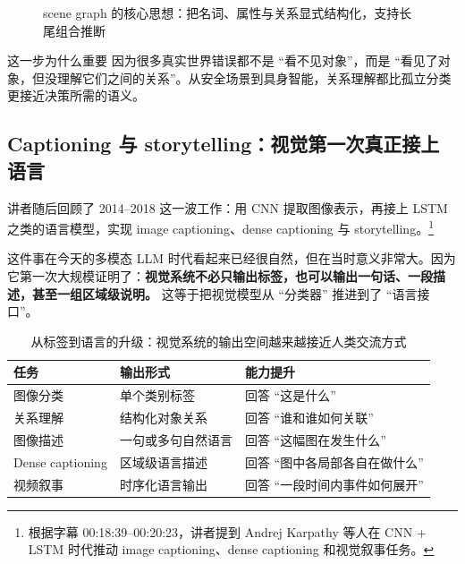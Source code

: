 \documentclass[a4paper]{article}
\begin{document}
\begin{figure}[H]
\centering
{}
\caption{scene graph 的核心思想：把名词、属性与关系显式结构化，支持长尾组合推断}
\end{figure}

\begin{importantbox}{这一步为什么重要}
因为很多真实世界错误都不是 ``看不见对象''，而是 ``看见了对象，但没理解它们之间的关系''。从安全场景到具身智能，关系理解都比孤立分类更接近决策所需的语义。
\end{importantbox}

\subsection{Captioning 与 storytelling：视觉第一次真正接上语言}

讲者随后回顾了 2014--2018 这一波工作：用 CNN 提取图像表示，再接上 LSTM 之类的语言模型，实现 image captioning、dense captioning 与 storytelling。\footnote{根据字幕 00:18:39--00:20:23，讲者提到 Andrej Karpathy 等人在 CNN + LSTM 时代推动 image captioning、dense captioning 和视觉叙事任务。}

这件事在今天的多模态 LLM 时代看起来已经很自然，但在当时意义非常大。因为它第一次大规模证明了：\textbf{视觉系统不必只输出标签，也可以输出一句话、一段描述，甚至一组区域级说明。} 这等于把视觉模型从 ``分类器'' 推进到了 ``语言接口''。

\begin{table}[H]
\centering
\begin{tabular}{p{3.2cm}p{4.4cm}p{6.0cm}}
\toprule
\textbf{任务} & \textbf{输出形式} & \textbf{能力提升} \\
\midrule
图像分类 & 单个类别标签 & 回答 ``这是什么'' \\
关系理解 & 结构化对象关系 & 回答 ``谁和谁如何关联'' \\
图像描述 & 一句或多句自然语言 & 回答 ``这幅图在发生什么'' \\
Dense captioning & 区域级语言描述 & 回答 ``图中各局部各自在做什么'' \\
视频叙事 & 时序化语言输出 & 回答 ``一段时间内事件如何展开'' \\
\bottomrule
\end{tabular}
\caption{从标签到语言的升级：视觉系统的输出空间越来越接近人类交流方式}
\end{table}
\end{document}
